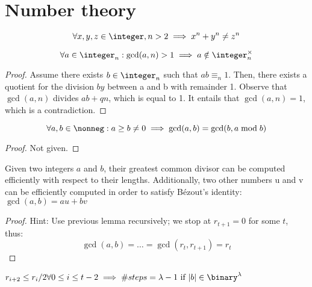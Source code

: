 
\section{Number theory}

\begin{theorem}
    \[
        \forall x, y, z \in \integer, n > 2 \implies x^n + y^n \neq z^n
    \]
\end{theorem}

\begin{lemma}
    \[
        \forall a \in \integer_n : \gcd(a, n) > 1 \implies a \notin \integer_n^\times
    \]
\end{lemma}

\begin{proof}
    Assume there exists $b \in \integer_n$ such that $ab \equiv_n 1$. Then, there exists a quotient for the division $by$ between a and b with remainder 1. Observe that $\gcd(a, n)$ divides $ab + qn$, which is equal to 1. It entails that $\gcd(a, n) = 1$, which is a contradiction.
\end{proof}

\begin{lemma}
    \[
        \forall a, b \in \nonneg : a \geq b \neq 0 \implies \gcd(a, b) = \gcd(b, a \mod b)
    \]
\end{lemma}

\begin{proof}
    Not given.
\end{proof}

\begin{theorem}
    Given two integers $a$ and $b$, their greatest common divisor can be computed efficiently with respect to their lengths. Additionally, two other numbers u and v can be efficiently computed in order to satisfy B\'ezout's identity: $\gcd(a, b) = au + bv$
\end{theorem}

\begin{proof}
    Hint: Use previous lemma recursively; we stop at $r_{t + 1} = 0$ for some $t$, thus:
    \[
        \gcd(a, b) = \dots = \gcd(r_t, r_{t + 1}) = r_t
    \]
\end{proof}

\begin{claim}
    $r_{i + 2} \leq r_i/2 \forall 0 \leq i \leq t - 2 \implies \#steps = \lambda - 1 \text{ if } |b| \in \binary^\lambda$
\end{claim}

